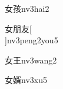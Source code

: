 \begin{verbete}[3;9]{女孩}{nv3hai2}
\end{verbete}

\begin{verbete}[3;8;4]{女朋友}[\\]{nv3peng2you5}
\end{verbete}

\begin{verbete}[3;4]{女王}{nv3wang2}
\end{verbete}

\begin{verbete}[3;12]{女婿}{nv3xu5}
\end{verbete}


